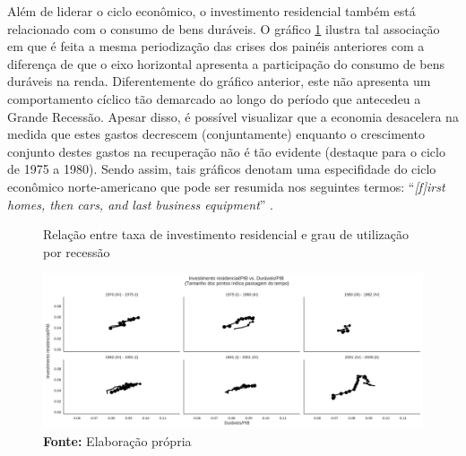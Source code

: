 
Além de liderar o ciclo econômico, o investimento residencial também está relacionado com o consumo de bens duráveis.
O gráfico \ref{FigInvesto_Duraveis} ilustra tal associação em que é feita a mesma periodização das crises dos painéis anteriores com a diferença de que o eixo horizontal apresenta a participação do consumo de bens duráveis na renda. 
Diferentemente do gráfico anterior, este não apresenta um comportamento cíclico tão demarcado ao longo do período que antecedeu a Grande Recessão. Apesar disso, é possível visualizar que a economia desacelera na medida que estes gastos decrescem (conjuntamente) enquanto o crescimento conjunto destes gastos na recuperação não é tão evidente (destaque para o ciclo de 1975 a 1980).
Sendo assim, tais gráficos denotam uma especifidade do ciclo econômico norte-americano que pode ser resumida nos seguintes termos: ``\textit{[f]irst homes, then cars, and last business equipment}'' \cite[p.~8]{leamer_housing_2007}.

\begin{figure}[H]
	\centering
	\caption{Relação entre taxa de investimento residencial e grau de utilização por recessão}
	\label{FigInvesto_Duraveis}
	\includegraphics[width=\textwidth]{../../Dados/Fatos_Estilizados/figs/Ciclo_Ih_Duraveis.png}
	\caption*{\textbf{Fonte:} Elaboração própria}
\end{figure}

